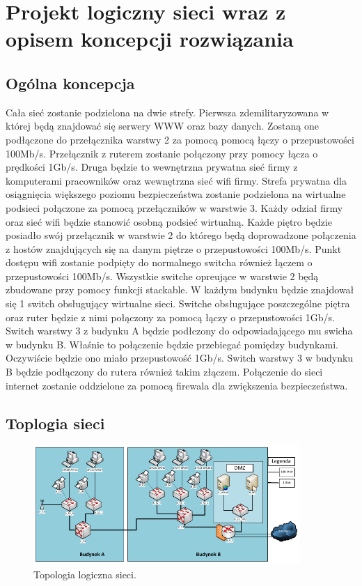 \documentclass{report}
\begin{document}
\section{Projekt logiczny sieci wraz z opisem koncepcji rozwiązania}
\subsection{Ogólna koncepcja}

Cała sieć zostanie podzielona na dwie strefy. Pierwsza zdemilitaryzowana w której będą znajdować się serwery WWW oraz bazy danych. 
Zostaną one podłączone do przełącznika warstwy 2 za pomocą pomocą łączy o przepustowości 100Mb/s. Przełącznik z ruterem zostanie połączony 
przy pomocy łącza o prędkości 1Gb/s. Druga będzie to wewnętrzna prywatna sieć firmy z komputerami pracowników oraz wewnętrzna sieć wifi firmy. 
Strefa prywatna dla osiągnięcia większego poziomu bezpieczeństwa zostanie podzielona na wirtualne podsieci połączone za pomocą przełączników w warstwie 3. Każdy odział firmy
oraz sieć wifi będzie stanowić osobną podsieć wirtualną. Każde piętro będzie posiadło swój przełącznik w warstwie 2 do którego będą
doprowadzone połączenia z hostów znajdujących się na danym piętrze o przepustowości 100Mb/s.
Punkt dostępu wifi zostanie  podpięty do normalnego switcha również łączem o przepustowości 100Mb/s. Wszystkie switche opreujące
w warstwie 2 będą zbudowane przy pomocy funkcji stackable. W każdym budynku będzie znajdował 
się 1 switch obsługujący wirtualne sieci. Switche obsługujące poszczególne piętra oraz ruter będzie z nimi połączony za pomocą łączy o przepustowości 1Gb/s.
Switch warstwy 3 z budynku A będzie podłczony do odpowiadającego mu swicha w budynku B. Właśnie to połączenie będzie przebiegać pomiędzy budynkami. Oczywiście
będzie ono miało przepustowość 1Gb/s. Switch warstwy 3 w budynku B będzie podłączony do rutera również takim złączem. 
Połączenie do sieci internet zostanie oddzielone za pomocą firewala dla zwiększenia bezpieczeństwa.

\subsection{Toplogia sieci}
\begin{figure}[H]
  \centering
      \includegraphics[width=0.9\textwidth]{./obrazki/topo_log.png}
  \caption{Topologia logiczna sieci.}
\end{figure}
\end{document}
